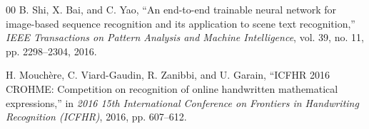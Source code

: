 \documentclass[conference]{IEEEtran}
\begin{document}
\begin{thebibliography}{00}
B. Shi, X. Bai, and C. Yao, ``An end-to-end trainable neural network for image-based sequence recognition and its application to scene text recognition,'' \textit{IEEE Transactions on Pattern Analysis and Machine Intelligence}, vol. 39, no. 11, pp. 2298--2304, 2016.

H. Mouchère, C. Viard-Gaudin, R. Zanibbi, and U. Garain, ``ICFHR 2016 CROHME: Competition on recognition of online handwritten mathematical expressions,'' in \textit{2016 15th International Conference on Frontiers in Handwriting Recognition (ICFHR)}, 2016, pp. 607--612.

\end{thebibliography}
\end{document}
